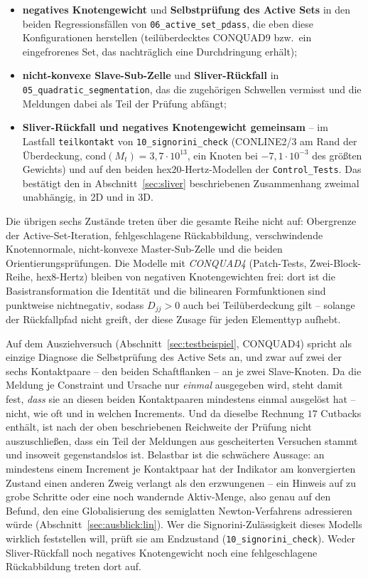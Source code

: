 \documentclass[a4paper,11pt]{article}
\def\bm#1{#1}%
\def\tilde#1{#1}%
\newcommand{\code}[1]{\texttt{\small #1}}
\newcommand{\file}[1]{\texttt{\small #1}}
\begin{document}
\begin{itemize}\itemsep2pt
  \item \textbf{negatives Knotengewicht} und \textbf{Selbstprüfung des Active Sets} in den beiden
        Regressionsfällen von \file{06\_active\_set\_pdass}, die eben diese Konfigurationen
        herstellen (teilüberdecktes CONQUAD9 bzw.\ ein eingefrorenes Set, das nachträglich eine
        Durchdringung erhält);
  \item \textbf{nicht-konvexe Slave-Sub-Zelle} und \textbf{Sliver-Rückfall} in
        \file{05\_quadratic\_segmentation}, das die zugehörigen Schwellen vermisst und die
        Meldungen dabei als Teil der Prüfung abfängt;
  \item \textbf{Sliver-Rückfall und negatives Knotengewicht gemeinsam} -- im Lastfall
        \code{teilkontakt} von \file{10\_signorini\_check} (CONLINE2/3 am Rand der Überdeckung,
        $\mathrm{cond}(\bm M_t)=3{,}7\cdot10^{13}$, ein Knoten bei $-7{,}1\cdot10^{-3}$ des
        größten Gewichts) und auf den beiden hex20-Hertz-Modellen der \file{Control\_Tests}. Das
        bestätigt den in Abschnitt~\ref{sec:sliver} beschriebenen Zusammenhang zweimal
        unabhängig, in 2D und in 3D.
\end{itemize}

\noindent Die übrigen sechs Zustände treten über die gesamte Reihe nicht auf: Obergrenze der
Active-Set-Iteration, fehlgeschlagene Rückabbildung, verschwindende Knotennormale, nicht-konvexe
Master-Sub-Zelle und die beiden Orientierungsprüfungen. Die Modelle mit \emph{CONQUAD4}
(Patch-Tests, Zwei-Block-Reihe, hex8-Hertz) bleiben von negativen Knotengewichten frei: dort ist
die Basistransformation die Identität und die bilinearen Formfunktionen sind punktweise
nichtnegativ, sodass $\tilde D_{jj}>0$ auch bei Teilüberdeckung gilt -- solange der Rückfallpfad
nicht greift, der diese Zusage für jeden Elementtyp aufhebt.

Auf dem Ausziehversuch (Abschnitt~\ref{sec:testbeispiel}, CONQUAD4) spricht als einzige Diagnose
die Selbstprüfung des Active Sets an, und zwar auf zwei der sechs Kontaktpaare -- den beiden
Schaftflanken -- an je zwei Slave-Knoten. Da die Meldung je Constraint und Ursache nur
\emph{einmal} ausgegeben wird, steht damit fest, \emph{dass} sie an diesen beiden Kontaktpaaren
mindestens einmal ausgelöst hat -- nicht, wie oft
und in welchen Increments. Und da dieselbe Rechnung $17$ Cutbacks enthält, ist nach der oben
beschriebenen Reichweite der Prüfung nicht auszuschließen, dass ein Teil der Meldungen aus
gescheiterten Versuchen stammt und insoweit gegenstandslos ist. Belastbar ist die schwächere
Aussage: an mindestens einem Increment je Kontaktpaar hat der Indikator am konvergierten Zustand
einen anderen Zweig verlangt als den erzwungenen -- ein Hinweis auf zu grobe Schritte oder eine
noch wandernde Aktiv-Menge, also genau auf den Befund, den eine Globalisierung des semiglatten
Newton-Verfahrens adressieren würde (Abschnitt~\ref{sec:ausblick:lin}). Wer die
Signorini-Zulässigkeit dieses Modells wirklich feststellen will, prüft sie am Endzustand
(\file{10\_signorini\_check}). Weder Sliver-Rückfall noch negatives Knotengewicht noch eine
fehlgeschlagene Rückabbildung treten dort auf.
\end{document}
